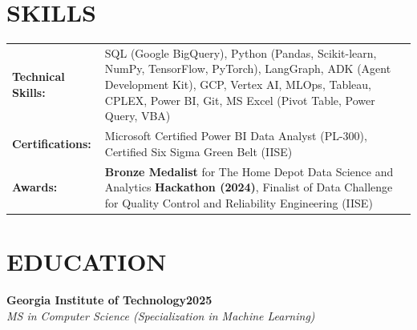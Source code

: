 \documentclass[letterpaper,10pt]{article}
\newcommand{\heading}[2]{
  \hspace{0pt}#1\hfill#2\\
}
\newcommand{\headingBf}[2]{
  \heading{\textbf{#1}}{\textbf{#2}}
}
\newcommand{\headingIt}[2]{
  \heading{\textit{#1}}{\textit{#2}}
  \vspace{0.2em}
}
\begin{document}
  
\section{SKILLS}
\begin{tabular}{@{}p{3cm}p{15.5cm}@{}}
    \textbf{Technical Skills:} & SQL (Google BigQuery), Python (Pandas, Scikit-learn, NumPy, TensorFlow, PyTorch), LangGraph, ADK (Agent Development Kit), GCP, Vertex AI, MLOps, Tableau, CPLEX, Power BI, Git, MS Excel (Pivot Table, Power Query, VBA) \\
    \textbf{Certifications:} & Microsoft Certified Power BI Data Analyst (PL-300), Certified Six Sigma Green Belt (IISE)  \\
    \textbf{Awards:} & \textbf{Bronze Medalist} for The Home Depot Data Science and Analytics \textbf{Hackathon (2024)}, Finalist of Data Challenge for Quality Control and Reliability Engineering (IISE) \\

\end{tabular}

  \section{EDUCATION}

  \headingBf{Georgia Institute of Technology}{2025} 
  \headingIt{MS in Computer Science (Specialization in Machine Learning)}{}
\end{document}
